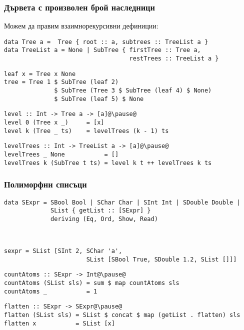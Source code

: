 \documentclass[alsotrans]{beamerswitch}
\begin{document}
\begin{frame}[fragile]
  \frametitle{Дървета с произволен брой наследници}
\small
  Можем да правим \alert{взаимнорекурсивни} дефиниции:
\begin{lstlisting}
data Tree a =  Tree { root :: a, subtrees :: TreeList a }
data TreeList a = None | SubTree { firstTree :: Tree a,
                                   restTrees :: TreeList a }
\end{lstlisting}
\pause
\begin{lstlisting}
leaf x = Tree x None
tree = Tree 1 $ SubTree (leaf 2)
              $ SubTree (Tree 3 $ SubTree (leaf 4) $ None)
              $ SubTree (leaf 5) $ None
\end{lstlisting}
\pause
\begin{lstlisting}
level :: Int -> Tree a -> [a]@\pause@
level 0 (Tree x _)     = [x]
level k (Tree _ ts)    = levelTrees (k - 1) ts
\end{lstlisting}
\pause
\begin{lstlisting}
levelTrees :: Int -> TreeList a -> [a]@\pause@
levelTrees _ None           = []
levelTrees k (SubTree t ts) = level k t ++ levelTrees k ts
\end{lstlisting}
\end{frame}

\begin{frame}[fragile]
  \frametitle{Полиморфни списъци}
\small
\begin{lstlisting}
data SExpr = SBool Bool | SChar Char | SInt Int | SDouble Double |
             SList { getList :: [SExpr] }
             deriving (Eq, Ord, Show, Read)
\end{lstlisting}
  \ \pause
\begin{lstlisting}
sexpr = SList [SInt 2, SChar 'a',
                       SList [SBool True, SDouble 1.2, SList []]]
\end{lstlisting}
  \pause
\begin{lstlisting}
countAtoms :: SExpr -> Int@\pause@
countAtoms (SList sls) = sum $ map countAtoms sls
countAtoms _           = 1
\end{lstlisting}
  \pause
\begin{lstlisting}
flatten :: SExpr -> SExpr@\pause@
flatten (SList sls) = SList $ concat $ map (getList . flatten) sls
flatten x           = SList [x]
\end{lstlisting}
\end{frame}
\end{document}
